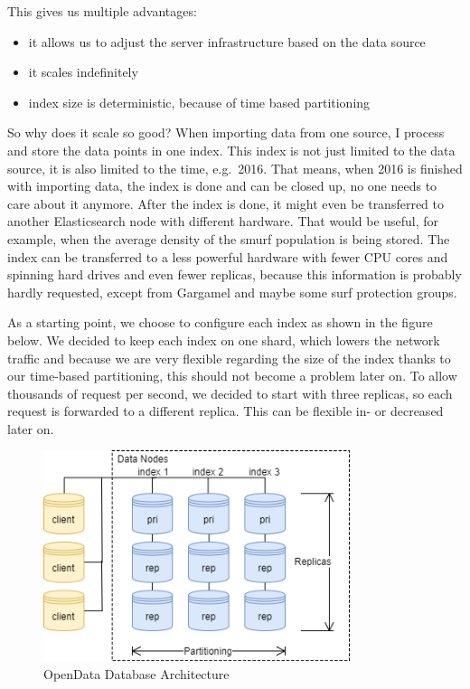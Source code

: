 This gives us multiple advantages:

\begin{itemize}
\tightlist
\item
  it allows us to adjust the server infrastructure based on the data
  source
\item
  it scales indefinitely
\item
  index size is deterministic, because of time based partitioning
\end{itemize}

So why does it scale so good? When importing data from one source, I
process and store the data points in one index. This index is not just
limited to the data source, it is also limited to the time, e.g.~2016.
That means, when 2016 is finished with importing data, the index is done
and can be closed up, no one needs to care about it anymore. After the
index is done, it might even be transferred to another Elasticsearch
node with different hardware. That would be useful, for example, when
the average density of the smurf population is being stored. The index
can be transferred to a less powerful hardware with fewer CPU cores and
spinning hard drives and even fewer replicas, because this information
is probably hardly requested, except from Gargamel and maybe some surf
protection groups.

As a starting point, we choose to configure each index as shown in the
figure below. We decided to keep each index on one shard, which lowers
the network traffic and because we are very flexible regarding the size
of the index thanks to our time-based partitioning, this should not
become a problem later on. To allow thousands of request per second, we
decided to start with three replicas, so each request is forwarded to a
different replica. This can be flexible in- or decreased later on.

\begin{figure}[htbp]
	\centering
	\includegraphics[width=0.8\textwidth]{images/07_database_architecture.png}
	\caption{OpenData Database Architecture}
	\label{fig:db-architecture}
\end{figure}

